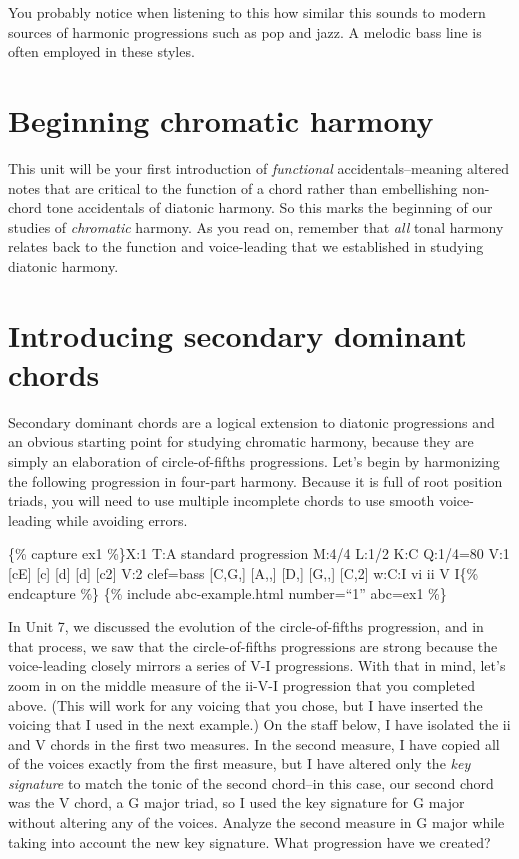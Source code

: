 \documentclass{book}
\begin{document}
You probably notice when listening to this how similar this sounds to modern
sources of harmonic progressions such as pop and jazz. A melodic bass line is
often employed in these styles.

\hypertarget{beginning-chromatic-harmony}{%
\section{Beginning chromatic harmony}\label{beginning-chromatic-harmony}}

This unit will be your first introduction of \emph{functional}
accidentals--meaning altered notes that are critical to the function of a
chord rather than embellishing non-chord tone accidentals of diatonic harmony.
So this marks the beginning of our studies of \emph{chromatic} harmony. As you
read on, remember that \emph{all} tonal harmony relates back to the function
and voice-leading that we established in studying diatonic harmony.

\hypertarget{introducing-secondary-dominant-chords}{%
\section{Introducing secondary dominant
chords}\label{introducing-secondary-dominant-chords}}

Secondary dominant chords are a logical extension to diatonic progressions and
an obvious starting point for studying chromatic harmony, because they are
simply an elaboration of circle-of-fifths progressions. Let's begin by
harmonizing the following progression in four-part harmony. Because it is full
of root position triads, you will need to use multiple incomplete chords to
use smooth voice-leading while avoiding errors.

\{\% capture ex1 \%\}X:1 T:A standard progression M:4/4 L:1/2 K:C Q:1/4=80 V:1
{[}cE{]} {[}c{]}\textbar{} {[}d{]} {[}d{]}\textbar{} {[}c2{]}\textbar{]} V:2
clef=bass {[}C,G,{]} {[}A,,{]}\textbar{} {[}D,{]} {[}G,,{]}\textbar{}
{[}C,2{]}\textbar{]} w:C:I vi ii V I\{\% endcapture \%\} \{\% include
abc-example.html number=``1'' abc=ex1 \%\}

In Unit 7, we discussed the evolution of the circle-of-fifths progression, and
in that process, we saw that the circle-of-fifths progressions are strong
because the voice-leading closely mirrors a series of V-I progressions. With
that in mind, let's zoom in on the middle measure of the ii-V-I progression
that you completed above. (This will work for any voicing that you chose, but
I have inserted the voicing that I used in the next example.) On the staff
below, I have isolated the ii and V chords in the first two measures. In the
second measure, I have copied all of the voices exactly from the first
measure, but I have altered only the \emph{key signature} to match the tonic
of the second chord--in this case, our second chord was the V chord, a G major
triad, so I used the key signature for G major without altering any of the
voices. Analyze the second measure in G major while taking into account the
new key signature. What progression have we created?
\end{document}
